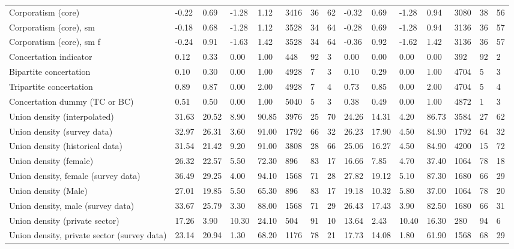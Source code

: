 \begin{longtable}{lllllllllllllll}
Corporatism (core) & -0.22 & 0.69 & -1.28 & 1.12 & 3416 & 36 & 62 & -0.32 & 0.69 & -1.28 & 0.94 & 3080 & 38 & 56\\
\addlinespace
Corporatism (core), sm & -0.18 & 0.68 & -1.28 & 1.12 & 3528 & 34 & 64 & -0.28 & 0.69 & -1.28 & 0.94 & 3136 & 36 & 57\\
Corporatism (core), sm f & -0.24 & 0.91 & -1.63 & 1.42 & 3528 & 34 & 64 & -0.36 & 0.92 & -1.62 & 1.42 & 3136 & 36 & 57\\
Concertation indicator & 0.12 & 0.33 & 0.00 & 1.00 & 448 & 92 & 3 & 0.00 & 0.00 & 0.00 & 0.00 & 392 & 92 & 2\\
Bipartite concertation & 0.10 & 0.30 & 0.00 & 1.00 & 4928 & 7 & 3 & 0.10 & 0.29 & 0.00 & 1.00 & 4704 & 5 & 3\\
Tripartite concertation & 0.89 & 0.87 & 0.00 & 2.00 & 4928 & 7 & 4 & 0.73 & 0.85 & 0.00 & 2.00 & 4704 & 5 & 4\\
\addlinespace
Concertation dummy (TC or BC) & 0.51 & 0.50 & 0.00 & 1.00 & 5040 & 5 & 3 & 0.38 & 0.49 & 0.00 & 1.00 & 4872 & 1 & 3\\
Union density (interpolated) & 31.63 & 20.52 & 8.90 & 90.85 & 3976 & 25 & 70 & 24.26 & 14.31 & 4.20 & 86.73 & 3584 & 27 & 62\\
Union density (survey data) & 32.97 & 26.31 & 3.60 & 91.00 & 1792 & 66 & 32 & 26.23 & 17.90 & 4.50 & 84.90 & 1792 & 64 & 32\\
Union density (historical data) & 31.54 & 21.42 & 9.20 & 91.00 & 3808 & 28 & 66 & 25.06 & 16.27 & 4.50 & 84.90 & 4200 & 15 & 72\\
Union density (female) & 26.32 & 22.57 & 5.50 & 72.30 & 896 & 83 & 17 & 16.66 & 7.85 & 4.70 & 37.40 & 1064 & 78 & 18\\
\addlinespace
Union density, female (survey data) & 36.49 & 29.25 & 4.00 & 94.10 & 1568 & 71 & 28 & 27.82 & 19.12 & 5.10 & 87.30 & 1680 & 66 & 29\\
Union density (Male) & 27.01 & 19.85 & 5.50 & 65.30 & 896 & 83 & 17 & 19.18 & 10.32 & 5.80 & 37.00 & 1064 & 78 & 20\\
Union density, male (survey data) & 33.67 & 25.79 & 3.30 & 88.00 & 1568 & 71 & 29 & 26.43 & 17.43 & 3.90 & 82.50 & 1680 & 66 & 31\\
Union density (private sector) & 17.26 & 3.90 & 10.30 & 24.10 & 504 & 91 & 10 & 13.64 & 2.43 & 10.40 & 16.30 & 280 & 94 & 6\\
Union density, private sector (survey data) & 23.14 & 20.94 & 1.30 & 68.20 & 1176 & 78 & 21 & 17.73 & 14.08 & 1.80 & 61.90 & 1568 & 68 & 29\\

\end{longtable}

